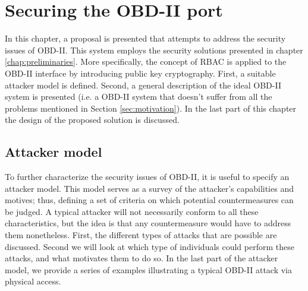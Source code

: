 \chapter{Securing the OBD-II port}
\label{chap:solution}

In this chapter, a proposal is presented that attempts to address the security issues of OBD-II. This system employs the security solutions presented in chapter \ref{chap:preliminaries}. More specifically, the concept of RBAC is applied to the OBD-II interface by introducing public key cryptography. First, a suitable attacker model is defined. Second, a general description of the ideal OBD-II system is presented (i.e. a OBD-II system that doesn't suffer from all the problems mentioned in Section \ref{sec:motivation}). In the last part of this chapter the design of the proposed solution is discussed.

\section{Attacker model} 
\label{sec:attacker_model}

To further characterize the security issues of OBD-II, it is useful to specify an attacker model. This model serves as a survey of the attacker's capabilities and motives; thus, defining a set of criteria on which potential countermeasures can be judged. A typical attacker will not necessarily conform to all these characteristics, but the idea is that any countermeasure would have to address them nonetheless. First, the different types of attacks that are possible are discussed. Second we will look at which type of individuals could perform these attacks, and what motivates them to do so. In the last part of the attacker model, we provide a series of examples illustrating a typical OBD-II attack via physical access.

